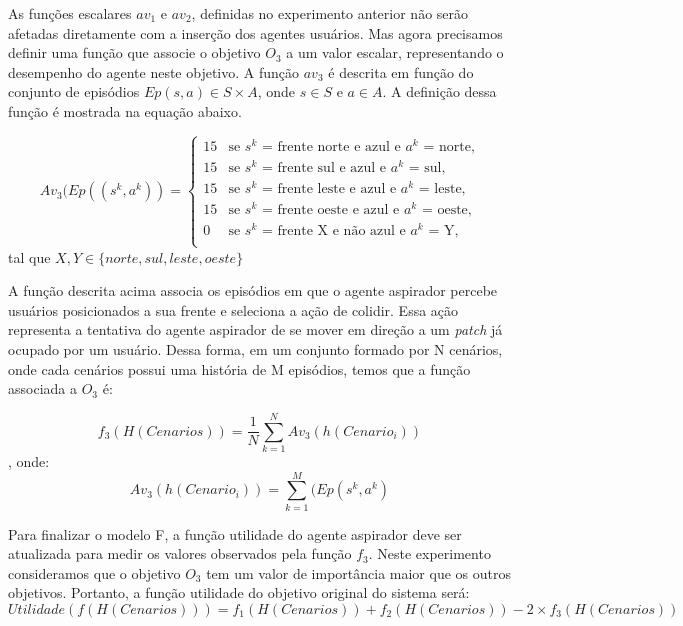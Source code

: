 As funções escalares $av_1$ e $av_2$, definidas no experimento anterior não serão afetadas diretamente com a inserção dos agentes usuários. Mas agora precisamos definir uma função que associe o objetivo $O_3$ a um valor escalar, representando o desempenho do agente neste objetivo. A função $av_3$ é descrita em função do conjunto de episódios $Ep(s, a) \in S\times A$, onde $s \in S$ e $a \in A$. A definição dessa função é mostrada na equação abaixo. 

\[
Av_3(Ep((s^k, a^k)) =
\begin{cases}
  15 & \text{se $s^k$ = frente norte e azul e $a^k$ = norte,}\\
  15 & \text{se $s^k$ = frente sul e azul e $a^k$ = sul,}\\
  15 & \text{se $s^k$ = frente leste e azul e $a^k$ = leste,}\\
  15 & \text{se $s^k$ = frente oeste e azul e $a^k$ = oeste,}\\
  0 & \text{se $s^k$ = frente X e não azul e $a^k$ = Y,}\\
\end{cases}
\]
 tal que $X, Y \in \{ norte, sul, leste, oeste\}$ 

A função descrita acima associa os episódios em que o agente aspirador percebe usuários posicionados a sua frente e seleciona a ação de colidir. Essa ação representa a tentativa do agente aspirador de se mover em direção a um \textit{patch} já ocupado por um usuário. Dessa forma, em um conjunto formado por N cenários, onde cada cenários possui uma história de M episódios, temos que a função associada a $O_3$ é:

\begin{equation}
    f_3(H(Cenarios)) = \frac{1}{N}\sum_{k=1}^{N}Av_3(h(Cenario_i))
\end{equation}
, onde:
\begin{equation}
    Av_3(h(Cenario_i)) = \sum_{k=1}^{M}(Ep(s^k, a^k)
\end{equation}

Para finalizar o modelo F, a função utilidade do agente aspirador deve ser atualizada para medir os valores observados pela função $f_3$. Neste experimento consideramos que o objetivo $O_3$ tem um valor de importância maior que os outros objetivos. Portanto, a função utilidade do objetivo original do sistema será:
\begin{equation}
    Utilidade(f (H(Cenarios)))= f_1 (H(Cenarios)) + f_2 (H(Cenarios)) - 2 \times f_3 (H(Cenarios))
\end{equation}


